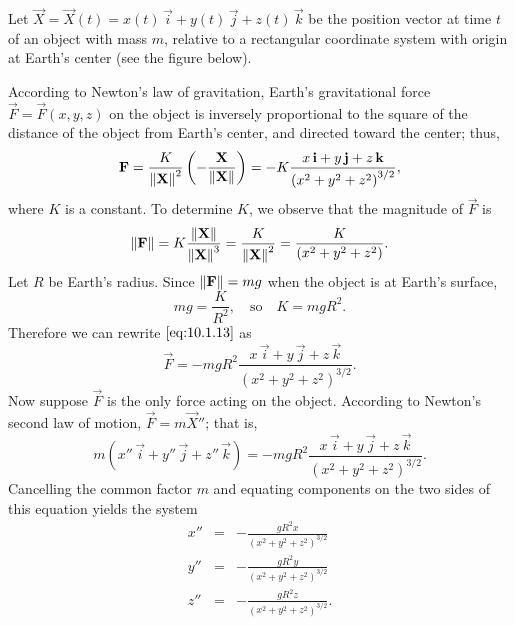 \documentclass{ximera}
\begin{document}
\begin{example}\label{example:10.1.3}
Let $\vec{X}=\vec{X}(t)=x(t)\,\vec{i}+y(t)\,\vec{j}+z(t)\,\vec{k}$ be
the position vector at time $t$ of an object with mass $m$, relative
to a rectangular coordinate system with origin at Earth's center
(see the figure below). 

\begin{center}
\end{center}


According to Newton's law of gravitation,
Earth's gravitational force $\vec{F}=\vec{F}(x,y,z)$ on the object is
inversely proportional to the square of the distance of the object
from Earth's center, and directed toward the center;   thus,
\begin{equation} \label{eq:10.1.13}
\mathbf{F}=\frac{K}{\left\lVert\mathbf{X}\right\rVert^2}\left(-\frac{\mathbf{X}}
{\left\lVert\mathbf{X}\right\rVert}\right)=-K\frac{x\,\mathbf{i}+y\,\mathbf{j}+z\,\mathbf{k}}{\left(x^2+y^2+z^2\right)^{3/2}},
\end{equation}
where $K$ is a constant.  To determine $K$,  we observe that the magnitude
of $\vec{F}$  is
$$
\left\lVert\mathbf{F}\right\rVert=K\frac{\left\lVert\mathbf{X}\right\rVert}{\left\lVert\mathbf{X}\right\rVert^3}=\frac{K}{\left\lVert\mathbf{X}\right\rVert^2}
=\frac{K}{(x^2+y^2+z^2)}.
$$
Let $R$  be Earth's radius.
Since $\left\lVert\mathbf{F}\right\rVert=mg$ when the object is at Earth's
surface,
$$
mg = \frac{K}{R^2},\quad\mbox{so}\quad K=mgR^2.
$$
Therefore we can rewrite $\eqref{eq:10.1.13}$ as
$$
\vec{F}=-mgR^2\frac{x\,\vec{i}+y\,\vec{j}+z\,\vec{k}}{\left(x^2+y^2+z^2\right)^{3/2}}.
$$
Now suppose $\vec{F}$ is the only force acting on the object.
According to Newton's second law of motion, $\vec{F}=m\vec{X}''$;   that
is,
$$
 m(x''\,\vec{i}+y''\,\vec{j}+z''\,\vec{k})=
-mgR^2\frac{x\,\vec{i}+y\,\vec{j}+z\,\vec{k}}{\left(x^2+y^2+z^2\right)^{3/2}}.
$$
Cancelling the common factor $m$ and equating components on the two sides
of this equation yields the  system
\begin{equation} \label{eq:10.1.14}
\begin{array}{rcl}
 x''&=&-\frac{gR^2x}{(x^2+y^2+z^2)^{3/2}}\\
 y''&=&-\frac{gR^2y}{(x^2+y^2+z^2)^{3/2}}\\
 z''&=&-\frac{gR^2z}{(x^2+y^2+z^2)^{3/2}}.
\end{array}
\end{equation}
\end{example}
\end{document}
